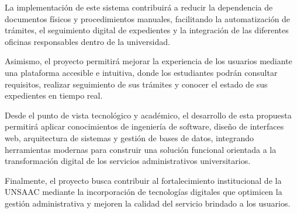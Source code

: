 La implementación de este sistema contribuirá a reducir la dependencia de documentos físicos y procedimientos manuales, facilitando la automatización de trámites, el seguimiento digital de expedientes y la integración de las diferentes oficinas responsables dentro de la universidad.

Asimismo, el proyecto permitirá mejorar la experiencia de los usuarios mediante una plataforma accesible e intuitiva, donde los estudiantes podrán consultar requisitos, realizar seguimiento de sus trámites y conocer el estado de sus expedientes en tiempo real.

\vspace{0.3cm}

Desde el punto de vista tecnológico y académico, el desarrollo de esta propuesta permitirá aplicar conocimientos de ingeniería de software, diseño de interfaces web, arquitectura de sistemas y gestión de bases de datos, integrando herramientas modernas para construir una solución funcional orientada a la transformación digital de los servicios administrativos universitarios.

Finalmente, el proyecto busca contribuir al fortalecimiento institucional de la UNSAAC mediante la incorporación de tecnologías digitales que optimicen la gestión administrativa y mejoren la calidad del servicio brindado a los usuarios.

